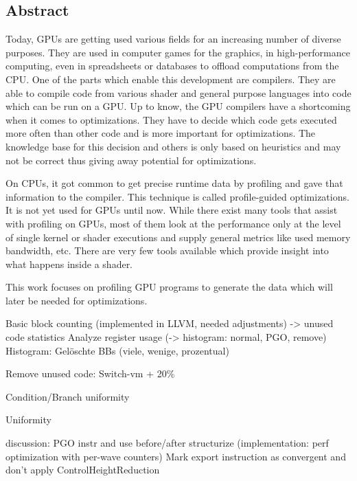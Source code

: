 \newpage
\vspace*{3.5cm}
\begin{center}
\begin{minipage}{12.5cm}
\section*{Abstract}
Today, GPUs are getting used various fields for an increasing number of diverse purposes. They are used in computer games for the graphics, in high-performance computing, even in spreadsheets or databases to offload computations from the CPU.
One of the parts which enable this development are compilers. They are able to compile code from various shader and general purpose languages into code which can be run on a GPU.
Up to know, the GPU compilers have a shortcoming when it comes to optimizations. They have to decide which code gets executed more often than other code and is more important for optimizations.
The knowledge base for this decision and others is only based on heuristics and may not be correct thus giving away potential for optimizations.

On CPUs, it got common to get precise runtime data by profiling and gave that information to the compiler. This technique is called profile-guided optimizations. It is not yet used for GPUs until now.
While there exist many tools that assist with profiling on GPUs, most of them look at the performance only at the level of single kernel or shader executions and supply general metrics like used memory bandwidth, etc.
There are very few tools available which provide insight into what happens inside a shader.

This work focuses on profiling GPU programs to generate the data which will later be needed for optimizations.

Basic block counting (implemented in LLVM, needed adjustments)
-> unused code statistics
Analyze register usage (-> histogram: normal, PGO, remove)
Histogram: Gelöschte BBs (viele, wenige, prozentual)

Remove unused code: Switch-vm + 20\%

Condition/Branch uniformity

Uniformity

discussion: PGO instr and use before/after structurize
(implementation: perf optimization with per-wave counters)
Mark export instruction as convergent and don’t apply ControlHeightReduction

\end{minipage}
\end{center}



